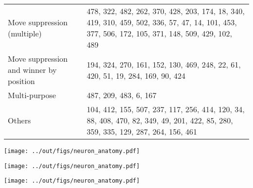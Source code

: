\documentclass{article}
\newcommand{\ttgpt}{TicTacGPT\xspace}
\begin{document}
\begin{table}[h]
\begin{tabular}{p{}p{}}
        Move suppression (multiple)
         & 478, 322, 482, 262, 370, 428, 203, 174, 18, 340, 419, 310, 459, 502, 336, 57, 47, 14, 101, 453, 377, 506, 172, 105, 371, 148, 509, 429, 102, 489         \\
        Move suppression and winner by position
         & 194, 324, 270, 161, 152, 130, 469, 248, 22, 61, 420, 51, 19, 284, 169, 90, 424                                                                           \\
        Multi-purpose
         & 487, 209, 483, 6, 167                                                                                                                                    \\
        Others
         & 104, 412, 155, 507, 237, 117, 256, 414, 120, 34, 88, 408, 470, 82, 349, 49, 201, 422, 85, 280, 359, 335, 129, 287, 264, 156, 461                         \\
        \bottomrule
    \end{tabular}
\end{table}

\begin{center}
    \begin{figure*}[h]
        \centering
        \texttt{[image: ../out/figs/neuron\_anatomy.pdf]}
        \caption{Top neurons of \ttgpt visualised, ordered from the most the least important.}
    \end{figure*}
    \begin{figure*}[h]
        \centering
        \texttt{[image: ../out/figs/neuron\_anatomy.pdf]}
        \caption*{Top neurons of \ttgpt visualised, ordered from the most the least important. (cont.)}
    \end{figure*}
    \begin{figure*}[h]
        \centering
        \texttt{[image: ../out/figs/neuron\_anatomy.pdf]}
        \caption*{Top neurons of \ttgpt visualised, ordered from the most the least important. (cont.)}
    \end{figure*}
\end{center}
\end{document}
